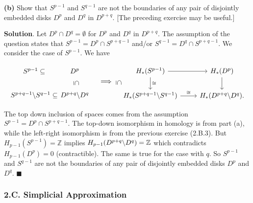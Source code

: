 \documentclass{article}
\newcommand{\Z}{\mathbb{Z}}
\begin{document}
\textbf{(b)} Show that $S^{p-1}$ and $S^{q-1}$ are not the boundaries of any pair of disjointly embedded disks $D^{p}$ and $D^{q}$ in $D^{p+q}$. [The preceding exercise may be useful.]
\medskip

\textbf{Solution}.  Let $D^{p}\cap D^{q} = \emptyset$ for $D^{p}$ and $D^{q}$ in $D^{p+q}$. The assumption of the question states that $S^{p-1} = D^{p}\cap S^{p+q-1}$ and/or $S^{q-1} = D^{q}\cap S^{p+q-1}$. We consider the case of $S^{p-1}$. We have

\[\begin{tikzcd}[remember picture]
S^{p-1} \subseteq & \hspace{-1cm} D^{p}\\
S^{p+q-1}\textnormal{\textbackslash} S^{q-1} \subseteq & \hspace{-1cm} D^{p+q}\textnormal{\textbackslash} D^{q}
\end{tikzcd}
\begin{tikzpicture}[overlay, remember picture]
\path (\tikzcdmatrixname-1-1) to node[midway,sloped]{$\subseteq$}
(\tikzcdmatrixname-2-1); \hspace{-0.4cm}
\path (\tikzcdmatrixname-1-2) to  node[midway,sloped]{$\subseteq$} 
(\tikzcdmatrixname-2-2);\hspace{0.55cm}
\end{tikzpicture}\quad \Longrightarrow\quad \begin{tikzcd}
H_{\ast}(S^{p-1})\arrow{r}\arrow{d}{\cong} & H_{\ast}(D^{p})\arrow{d}\\
H_{\ast}(S^{p+q-1}\textnormal{\textbackslash} S^{q-1})\arrow{r}{\cong} & H_{\ast}(D^{p+q}\textnormal{\textbackslash} D^{q}).
\end{tikzcd}\]

The top down inclusion of spaces comes from the assumption $S^{p-1} = D^{p}\cap S^{p+q-1}$. The top-down isomorphism in homology is from part (a), while the left-right isomorphism is from the previous exercise (2.B.3). But $H_{p-1}(S^{p-1}) = \Z$ implies $H_{p-1}(D^{p+q}\textnormal{\textbackslash} D^{q}) = \Z$ which contradicts $H_{p-1}(D^{p}) = 0$ (contractible). The same is true for the case with $q$. So $S^{p-1}$ and $S^{q-1}$ are not the boundaries of any pair of disjointly embedded disks $D^{p}$ and $D^{q}$. $\blacksquare$
\bigskip
\bigskip

\subsubsection*{2.C. Simplicial Approximation}
\end{document}
